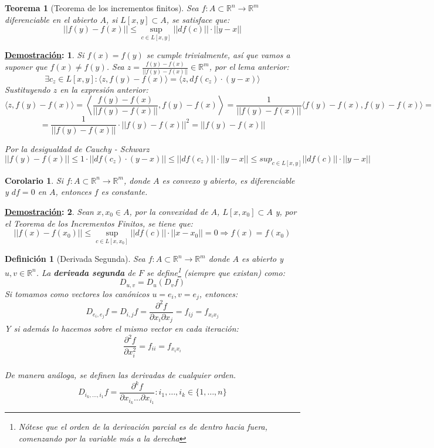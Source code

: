 \documentclass[10pt,a4paper,openright]{book}
\theoremstyle{break}
\newtheorem*{defi}{Definición}
\newtheorem*{theo}{Teorema}
\newtheorem*{coro}{Corolario}
\newtheorem*{demo}{\underline{Demostración}:}
\begin{document}
\begin{theo}[Teorema de los incrementos finitos]
Sea $f: A \subset \mathbb{R}^n \to \mathbb{R}^m$ diferenciable en el abierto $A$, si $L[x,y] \subset A$, se satisface que:
$$|| f(y) - f(x) || \leq \sup _{c \in L[x,y]} || df(c) || \cdot || y - x||$$
\end{theo}

\begin{demo}
Si  $f(x) = f(y)$ se cumple trivialmente, así que vamos a suponer que $f(x) \neq f(y)$. Sea $z = \frac{f(y) - f(x)}{|| f(y) - f(x) ||} \in \mathbb{R}^m$, por el lema anterior:
$$\exists c_z \in L[x,y] :  \langle z, f(y) - f(x)\rangle = \langle z, df(c_z) \cdot (y-x) \rangle$$
Sustituyendo $z$ en la expresión anterior:
$$\langle z, f(y) - f(x)\rangle = \left\langle \frac{f(y) - f(x)}{|| f(y) - f(x) ||}, f(y) - f(x)\right\rangle = \frac{1}{|| f(y) - f(x) ||} \langle f(y) - f(x), f(y) - f(x) \rangle =$$
$$=\frac{1}{|| f(y) - f(x) ||} \cdot || f(y) - f(x) ||^2 = || f(y) - f(x) ||$$

Por la desigualdad de Cauchy - Schwarz 
$$|| f(y) - f(x) || \leq 1 \cdot || df(c_z) \cdot (y-x) || \leq || df(c_z) || \cdot ||y-x|| \leq sup_{c \in L[x,y]} || df(c)|| \cdot || y - x|| $$
\end{demo}

\begin{coro}
Si $f: A \subset \mathbb{R}^n \to \mathbb{R}^m$, donde $A$ es convexo y abierto, es diferenciable y $df = 0$ en $A$, entonces $f$ es constante.
\end{coro}
\begin{demo}
Sean $x,x_0 \in A$, por la convexidad de $A$, $L[x,x_0] \subset A$ y, por el Teorema de los Incrementos Finitos, se tiene que:
$$|| f(x) - f(x_0) || \leq \sup_{c \in L[x,x_0]} || d f(c) || \cdot || x - x_0 || = 0 \Rightarrow f(x) = f(x_0)$$
\end{demo}

\begin{defi}[Derivada Segunda]
Sea $f: A \subset \mathbb{R}^n \to \mathbb{R}^m$ donde $A$ es abierto y $u,v \in \mathbb{R}^n$. La \textbf{derivada segunda} de $F$ se define\footnote{Nótese que el orden de la derivación parcial es de dentro hacia fuera, comenzando por la variable más a la derecha} (siempre que existan) como: 
$$D_{u,v} = D_u (D_v f)$$
Si tomamos como vectores los canónicos $u = e_i, v = e_j$, entonces:
$$D_{e_i, e_j} f = D_{i,j} f = \frac{\partial^2 f}{\partial x_i \partial x_j} = f_{ij} = f_{x_i x_j}$$
Y si además lo hacemos sobre el mismo vector en cada iteración:
$$\frac{\partial^2 f}{\partial x_i^2} = f_{ii} = f_{x_i x_i}$$\\
De manera análoga, se definen las derivadas de cualquier orden.
$$D_{i_k, \ldots, i_1} f = \frac{\partial^k f}{\partial x_{i_k} \ldots \partial x_{i_1}} : i_1, \ldots, i_k \in \{1, \ldots, n\}$$
\end{defi}
\end{document}
